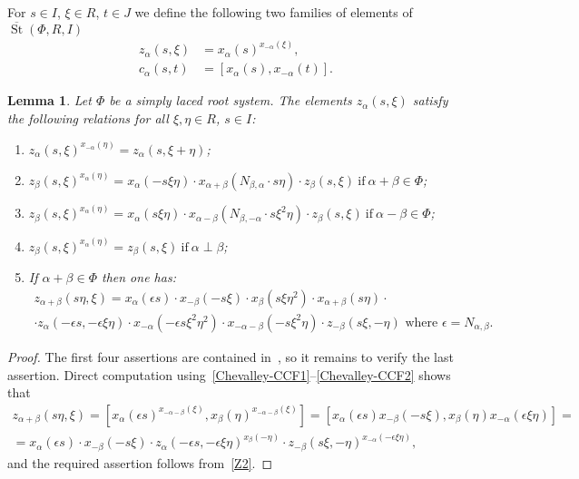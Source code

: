 \documentclass[oneside, 8pt]{amsart}
\newtheorem{lemma}{Lemma}
\theoremstyle{remark}
\theoremstyle{definition}
\numberwithin{lemma}{section}
\numberwithin{prop}{section}
\numberwithin{corollary}{section}
\numberwithin{externaltheorem}{section}
\DeclareMathOperator{\St}{St}
\numberwithin{equation}{section}
\begin{document}
For $s\in I$, $\xi \in R$, $t \in J$ we define the following two families of elements of $\overline{\St}(\Phi, R, I)$ 
\begin{align}
 z_\alpha(s, \xi) &= x_\alpha(s)^{x_{-\alpha}(\xi)}, \label{Zdef}\\
 c_\alpha(s, t)   &= [x_\alpha(s), x_{-\alpha}(t)]. \label{Cdef}
\end{align}

\begin{lemma}\label{Zrels} Let $\Phi$ be a simply laced root system.
The elements $z_\alpha(s, \xi)$ satisfy the following relations for all $\xi, \eta\in R$, $s\in I$:
\begin{enumerate} 
\item\label{Z1} $z_{\alpha}(s, \xi) ^ {x_{-\alpha}(\eta)} = z_{\alpha}(s, \xi + \eta)$;
\item\label{Z2} $z_{\beta}(s, \xi) ^ {x_{\alpha}(\eta)} = x_{\alpha} (- s\xi \eta) \cdot x_{\alpha+\beta} (N_{\beta, \alpha}\cdot s\eta)     \cdot z_{\beta}(s, \xi)\ \text{if}\ \alpha + \beta \in \Phi$;
\item\label{Z3} $z_{\beta}(s, \xi) ^ {x_{\alpha}(\eta)} = x_{\alpha} (s\xi \eta) \cdot x_{\alpha-\beta} (N_{\beta,-\alpha}\cdot s\xi^2\eta) \cdot z_{\beta}(s, \xi)\ \text{if}\ \alpha - \beta \in \Phi$;

\item\label{Z4} $z_{\beta}(s, \xi) ^ {x_{\alpha}(\eta)} = z_{\beta}(s, \xi)\ \text{if}\ \alpha\perp\beta$;
\item If $\alpha+\beta\in\Phi$ then one has:
\begin{multline} \label{Z5} z_{\alpha+\beta}(s\eta, \xi) = x_\alpha(\epsilon s)\cdot x_{-\beta}(-s\xi) \cdot x_{\beta}(s\xi\eta^2) \cdot x_{\alpha+\beta}(s \eta) \cdot \\ \cdot z_\alpha(-\epsilon s, -\epsilon \xi\eta) \cdot
  x_{-\alpha}(-\epsilon s\xi^2\eta^2) \cdot x_{-\alpha-\beta}(- s \xi^2 \eta) \cdot z_{-\beta}(s\xi, -\eta)\text{ where $\epsilon = N_{\alpha,\beta}$.}\end{multline}
\end{enumerate} \end{lemma}
\begin{proof}
The first four assertions are contained in~\cite[Lemma~9]{S15}, so it remains to verify the last assertion.
Direct computation using~\eqref{Chevalley-CCF1}--\eqref{Chevalley-CCF2} shows that
\begin{multline} \nonumber
  z_{\alpha+\beta}(s\eta, \xi) = [x_\alpha(\epsilon s)^{x_{-\alpha-\beta}(\xi)}, x_\beta(\eta)^{x_{-\alpha-\beta}(\xi)}] =
  [x_\alpha(\epsilon s) x_{-\beta}(-s\xi), x_{\beta}(\eta) x_{-\alpha}(\epsilon \xi\eta)] = \\ 
  = x_\alpha(\epsilon s) \cdot x_{-\beta}(-s\xi) \cdot z_\alpha(-\epsilon s, -\epsilon \xi\eta)^{x_{\beta}(-\eta)} \cdot z_{-\beta}(s\xi, -\eta)^{x_{-\alpha}(-\epsilon \xi\eta)},
\end{multline} 
and the required assertion follows from~\eqref{Z2}.
\end{proof}
\end{document}
